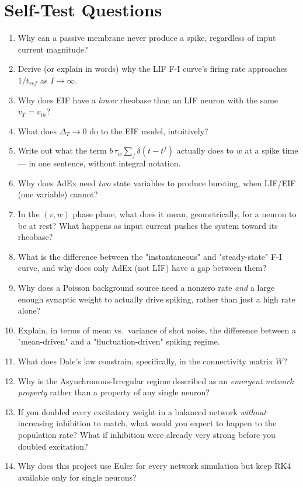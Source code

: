\documentclass[11pt,a4paper]{article}
\begin{document}
	\newpage
\section{Self-Test Questions}
\begin{enumerate}[itemsep=4pt, leftmargin=1.6em]
  \item Why can a passive membrane never produce a spike, regardless of input current magnitude?
  \item Derive (or explain in words) why the LIF F-I curve's firing rate approaches $1/t_{ref}$ as $I \to \infty$.
  \item Why does EIF have a \emph{lower} rheobase than an LIF neuron with the same $v_T = v_{th}$?
  \item What does $\Delta_T \to 0$ do to the EIF model, intuitively?
  \item Write out what the term $b\,\tau_w\sum_f \delta(t-t^f)$ actually does to $w$ at a spike time — in one sentence, without integral notation.
  \item Why does AdEx need \emph{two} state variables to produce bursting, when LIF/EIF (one variable) cannot?
  \item In the $(v,w)$ phase plane, what does it mean, geometrically, for a neuron to be at rest? What happens as input current pushes the system toward its rheobase?
  \item What is the difference between the "instantaneous" and "steady-state" F-I curve, and why does only AdEx (not LIF) have a gap between them?
  \item Why does a Poisson background source need a nonzero rate \emph{and} a large enough synaptic weight to actually drive spiking, rather than just a high rate alone?
  \item Explain, in terms of mean vs.\ variance of shot noise, the difference between a "mean-driven" and a "fluctuation-driven" spiking regime.
  \item What does Dale's law constrain, specifically, in the connectivity matrix $W$?
  \item Why is the Asynchronous-Irregular regime described as an \emph{emergent network property} rather than a property of any single neuron?
  \item If you doubled every excitatory weight in a balanced network \emph{without} increasing inhibition to match, what would you expect to happen to the population rate? What if inhibition were already very strong before you doubled excitation?
  \item Why does this project use Euler for every network simulation but keep RK4 available only for single neurons?
\end{enumerate}
\end{document}
